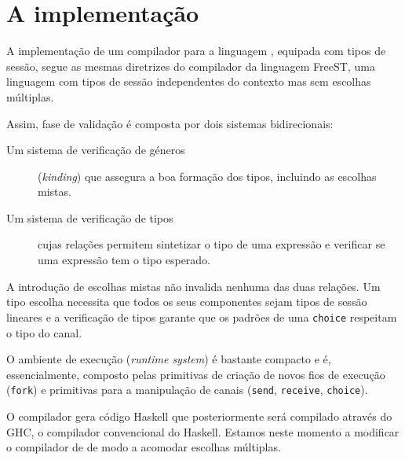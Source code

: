 \section{A implementação}

A implementação de um compilador para a linguagem \mixedchoice,
equipada com tipos de sessão, segue as mesmas diretrizes do compilador
da linguagem FreeST\cite{2019freest,2019freest-inforum}, uma linguagem
com tipos de sessão independentes do contexto mas sem escolhas
múltiplas.

Assim,  fase de validação é composta por dois sistemas bidirecionais:
\begin{description}
\item[Um sistema de verificação de géneros] (\textit{kinding}) que
  assegura  a boa formação dos tipos, incluindo as escolhas mistas.
\item[Um sistema de verificação de tipos] cujas relações permitem
  sintetizar o tipo de uma expressão e verificar se uma expressão tem
  o tipo esperado.
\end{description}
A introdução de escolhas mistas não invalida nenhuma das duas
relações.  Um tipo escolha necessita que todos os seus componentes
sejam tipos de sessão lineares e a verificação de tipos garante que os
padrões de uma \lstinline|choice| respeitam o tipo do canal.

O ambiente de execução (\textit{runtime system}) é bastante compacto e é, essencialmente, composto pelas primitivas de criação de novos fios de execução (\lstinline|fork|) e primitivas para a manipulação de canais (\lstinline|send|, \lstinline|receive|, \lstinline|choice|).


O compilador gera código Haskell que posteriormente será compilado através do GHC, o compilador convencional do Haskell.
%
Estamos neste momento a modificar o compilador de \freest{} de modo a
acomodar escolhas múltiplas.


